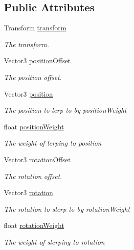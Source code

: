 \subsection*{Public Attributes}
\begin{DoxyCompactItemize}
\item 
Transform \mbox{\hyperlink{class_root_motion_1_1_final_i_k_1_1_constraints_abf9e4eec6aef044f13ea14920102a5da}{transform}}
\begin{DoxyCompactList}\small\item\em The transform. \end{DoxyCompactList}\item 
Vector3 \mbox{\hyperlink{class_root_motion_1_1_final_i_k_1_1_constraints_a0ece7b8f7622c10148e3f61b8cb17cf3}{position\+Offset}}
\begin{DoxyCompactList}\small\item\em The position offset. \end{DoxyCompactList}\item 
Vector3 \mbox{\hyperlink{class_root_motion_1_1_final_i_k_1_1_constraints_a65b8b74ef18ef43c8813b8415536b442}{position}}
\begin{DoxyCompactList}\small\item\em The position to lerp to by position\+Weight \end{DoxyCompactList}\item 
float \mbox{\hyperlink{class_root_motion_1_1_final_i_k_1_1_constraints_aec2ac7c636d98c4c80495a49ba45b829}{position\+Weight}}
\begin{DoxyCompactList}\small\item\em The weight of lerping to position \end{DoxyCompactList}\item 
Vector3 \mbox{\hyperlink{class_root_motion_1_1_final_i_k_1_1_constraints_afc7bfe72cdf690f596a15431e0292d33}{rotation\+Offset}}
\begin{DoxyCompactList}\small\item\em The rotation offset. \end{DoxyCompactList}\item 
Vector3 \mbox{\hyperlink{class_root_motion_1_1_final_i_k_1_1_constraints_a06402f3837cd7d42ad2c4c5c57f69e3e}{rotation}}
\begin{DoxyCompactList}\small\item\em The rotation to slerp to by rotation\+Weight \end{DoxyCompactList}\item 
float \mbox{\hyperlink{class_root_motion_1_1_final_i_k_1_1_constraints_a3ccac96167743ae143c80192d6ca820e}{rotation\+Weight}}
\begin{DoxyCompactList}\small\item\em The weight of slerping to rotation \end{DoxyCompactList}\end{DoxyCompactItemize}



